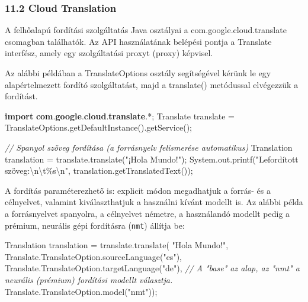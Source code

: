 \documentclass[
]{article}
\newenvironment{Shaded}{}{}
\newcommand{\BuiltInTok}[1]{\textcolor[rgb]{0.00,0.50,0.00}{#1}}
\newcommand{\CommentTok}[1]{\textcolor[rgb]{0.38,0.63,0.69}{\textit{#1}}}
\newcommand{\FunctionTok}[1]{\textcolor[rgb]{0.02,0.16,0.49}{#1}}
\newcommand{\ImportTok}[1]{\textcolor[rgb]{0.00,0.50,0.00}{\textbf{#1}}}
\newcommand{\KeywordTok}[1]{\textcolor[rgb]{0.00,0.44,0.13}{\textbf{#1}}}
\newcommand{\NormalTok}[1]{#1}
\newcommand{\OperatorTok}[1]{\textcolor[rgb]{0.40,0.40,0.40}{#1}}
\newcommand{\SpecialCharTok}[1]{\textcolor[rgb]{0.25,0.44,0.63}{#1}}
\newcommand{\StringTok}[1]{\textcolor[rgb]{0.25,0.44,0.63}{#1}}
\begin{document}
\hypertarget{cloud-translation}{%
\subsubsection{11.2 Cloud Translation}\label{cloud-translation}}

A felhőalapú fordítási szolgáltatás Java osztályai a
com.google.cloud.translate csomagban találhatók. Az API használatának
belépési pontja a Translate interfész, amely egy szolgáltatási proxyt
(proxy) képvisel.

Az alábbi példában a TranslateOptions osztály segítségével kérünk le egy
alapértelmezett fordító szolgáltatást, majd a translate() metódussal
elvégezzük a fordítást.

\begin{Shaded}
\begin{Highlighting}[]
\KeywordTok{import} \ImportTok{com}\OperatorTok{.}\ImportTok{google}\OperatorTok{.}\ImportTok{cloud}\OperatorTok{.}\ImportTok{translate}\OperatorTok{.*;}
\NormalTok{Translate translate }\OperatorTok{=}\NormalTok{ TranslateOptions}\OperatorTok{.}\FunctionTok{getDefaultInstance}\OperatorTok{().}\FunctionTok{getService}\OperatorTok{();}

\CommentTok{// Spanyol szöveg fordítása (a forrásnyelv felismerése automatikus)}
\NormalTok{Translation translation }\OperatorTok{=}\NormalTok{ translate}\OperatorTok{.}\FunctionTok{translate}\OperatorTok{(}\StringTok{"¡Hola Mundo!"}\OperatorTok{);}
\BuiltInTok{System}\OperatorTok{.}\FunctionTok{out}\OperatorTok{.}\FunctionTok{printf}\OperatorTok{(}\StringTok{"Lefordított szöveg:}\SpecialCharTok{\textbackslash{}n\textbackslash{}t\%s\textbackslash{}n}\StringTok{"}\OperatorTok{,}\NormalTok{ translation}\OperatorTok{.}\FunctionTok{getTranslatedText}\OperatorTok{());}
\end{Highlighting}
\end{Shaded}

A fordítás paraméterezhető is: explicit módon megadhatjuk a forrás- és a
célnyelvet, valamint kiválaszthatjuk a használni kívánt modellt is. Az
alábbi példa a forrásnyelvet spanyolra, a célnyelvet németre, a
használandó modellt pedig a prémium, neurális gépi fordításra
(\texttt{nmt}) állítja be:

\begin{Shaded}
\begin{Highlighting}[]
\NormalTok{Translation translation }\OperatorTok{=}
\NormalTok{    translate}\OperatorTok{.}\FunctionTok{translate}\OperatorTok{(}
        \StringTok{"Hola Mundo!"}\OperatorTok{,}
\NormalTok{        Translate}\OperatorTok{.}\FunctionTok{TranslateOption}\OperatorTok{.}\FunctionTok{sourceLanguage}\OperatorTok{(}\StringTok{"es"}\OperatorTok{),}
\NormalTok{        Translate}\OperatorTok{.}\FunctionTok{TranslateOption}\OperatorTok{.}\FunctionTok{targetLanguage}\OperatorTok{(}\StringTok{"de"}\OperatorTok{),}
        \CommentTok{// A "base" az alap, az "nmt" a neurális (prémium) fordítási modellt választja.}
\NormalTok{        Translate}\OperatorTok{.}\FunctionTok{TranslateOption}\OperatorTok{.}\FunctionTok{model}\OperatorTok{(}\StringTok{"nmt"}\OperatorTok{));}
\end{Highlighting}
\end{Shaded}
\end{document}
